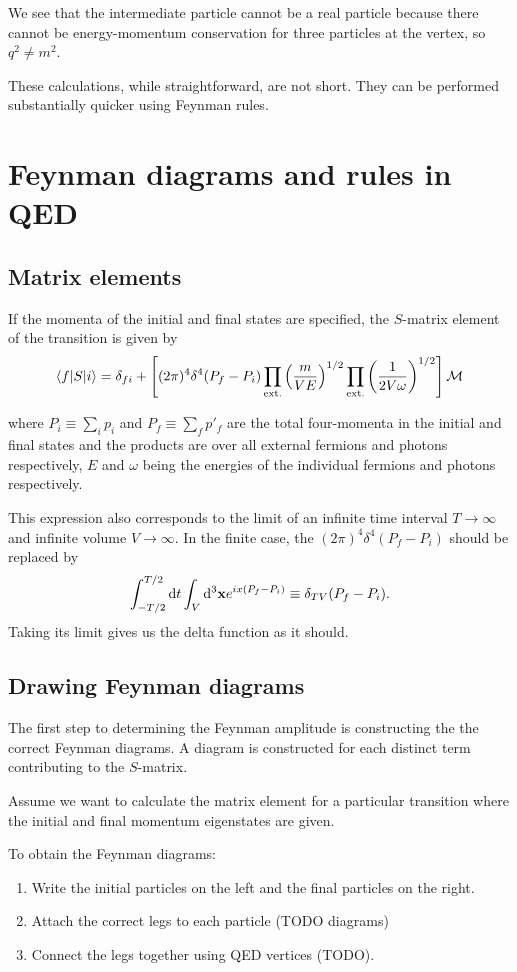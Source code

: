 We see that the intermediate particle cannot be a real particle because there cannot be energy-momentum conservation for three particles at the vertex, so $q^2 \neq m^2$.


These calculations, while straightforward, are not short. They can be performed substantially quicker using Feynman rules.

\section{Feynman diagrams and rules in QED}
\subsection{Matrix elements}
If the momenta of the initial and final states are specified, the $S$-matrix element of the transition is given by
\begin{equation}
\braket[S]{f}{i} = \delta_{fi} + \left[(2\pi)^4\delta^4(P_f - P_i)\prod_\text{ext.}\left(\frac{m}{VE}\right)^{1/2}\prod_\text{ext.}\left(\frac{1}{2V\omega}\right)^{1/2}\right]\mathcal{M} \label{Smel}
\end{equation}

where $P_i \equiv \sum_i p_i$ and $P_f \equiv \sum_f p'_f$ are the total four-momenta in the initial and final states and the products are over all external fermions and photons respectively, $E$ and $\omega$ being the energies of the individual fermions and photons respectively.

This expression also corresponds to the limit of an infinite time interval $T\to \infty$ and infinite volume $V\to \infty$. In the finite case, the $(2\pi)^4\delta^4(P_f - P_i)$ should be replaced by
\[ \int^{T/2}_{-T/2} \operatorname{d \!}{t}\int_V \operatorname{d \!}{^3 \bm{\mathrm{x}}} e^{ix(P_f - P_i)} \equiv \delta_{TV}(P_f - P_i). \]
Taking its limit gives us the delta function as it should.

\subsection{Drawing Feynman diagrams}
The first step to determining the Feynman amplitude is constructing the the correct Feynman diagrams. A diagram is constructed for each distinct term contributing to the $S$-matrix.

Assume we want to calculate the matrix element for a particular transition where the initial and final momentum eigenstates are given.

To obtain the Feynman diagrams:
\begin{enumerate}
\item Write the initial particles on the left and the final particles on the right.
\item Attach the correct legs to each particle (TODO diagrams)
\item Connect the legs together using QED vertices (TODO).
\end{enumerate}

